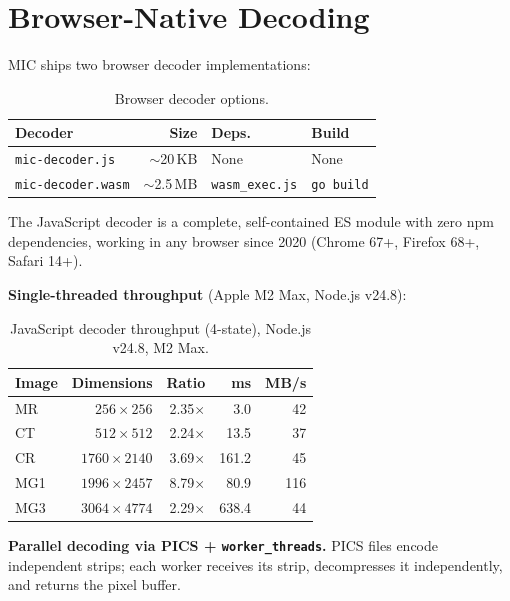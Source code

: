 \documentclass[journal]{IEEEtran}
\begin{document}
\section{Browser-Native Decoding}
\label{sec:browser}

MIC ships two browser decoder implementations:

\begin{table}[htbp]
\centering
\caption{Browser decoder options.}
\label{tab:browser-decoders}
\begin{tabular}{p{2.8cm}rll}
\toprule
Decoder & Size & Deps. & Build \\
\midrule
\texttt{mic-decoder.js} & $\sim$20\,KB & None & None \\
\texttt{mic-decoder.wasm} & $\sim$2.5\,MB & \texttt{wasm\_exec.js} & \texttt{go build} \\
\bottomrule
\end{tabular}
\end{table}

The JavaScript decoder is a complete, self-contained ES module with zero npm
dependencies, working in any browser since 2020 (Chrome 67+, Firefox 68+,
Safari 14+).

\textbf{Single-threaded throughput} (Apple M2 Max, Node.js v24.8):

\begin{table}[htbp]
\centering
\caption{JavaScript decoder throughput (4-state), Node.js v24.8, M2 Max.}
\label{tab:js-perf}
\begin{tabular}{lrrrr}
\toprule
Image & Dimensions & Ratio & ms & MB/s \\
\midrule
MR  & $256{\times}256$   & 2.35$\times$ &   3.0 &  42 \\
CT  & $512{\times}512$   & 2.24$\times$ &  13.5 &  37 \\
CR  & $1760{\times}2140$ & 3.69$\times$ & 161.2 &  45 \\
MG1 & $1996{\times}2457$ & 8.79$\times$ &  80.9 & 116 \\
MG3 & $3064{\times}4774$ & 2.29$\times$ & 638.4 &  44 \\
\bottomrule
\end{tabular}
\end{table}

\textbf{Parallel decoding via PICS + \texttt{worker\_threads}.} PICS files
encode independent strips; each worker receives its strip, decompresses it
independently, and returns the pixel buffer.
\end{document}
